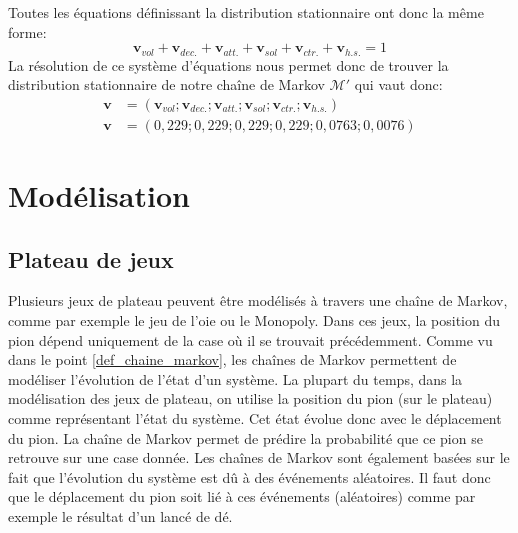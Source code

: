\documentclass[letterpaper]{article}
\begin{document}
      Toutes les équations définissant la distribution stationnaire ont donc  la même forme:
      $$\mathbf{v}_{vol} + \mathbf{v}_{dec.} + \mathbf{v}_{att.} + \mathbf{v}_{sol} + 
	\mathbf{v}_{ctr.} + \mathbf{v}_{h.s.} = 1$$
      La résolution de ce système d'équations nous permet donc de trouver la distribution
      stationnaire de notre chaîne de Markov $\mathcal{M}'$ qui vaut donc:
      \begin{align*}
       \mathbf{v} &= (\mathbf{v}_{vol}; \mathbf{v}_{dec.}; \mathbf{v}_{att.}; \mathbf{v}_{sol}; 
	  \mathbf{v}_{ctr.}; \mathbf{v}_{h.s.})\\
      \mathbf{v} &= (0,229; 0,229; 0,229; 0,229; 0,0763; 0,0076)
      \end{align*}
  
  
\section{Modélisation}

  \subsection{Plateau de jeux}
    Plusieurs jeux de plateau peuvent être modélisés à travers une chaîne de Markov,
    comme par exemple le jeu de l'oie ou le Monopoly.  Dans ces jeux,
    la position du pion dépend uniquement de la case où il se trouvait précédemment.
    Comme vu dans le point \ref{def_chaine_markov}, les chaînes de Markov permettent
    de modéliser l'évolution de l'état d'un système.  La plupart du temps, dans
    la modélisation des jeux de plateau, on utilise la position du pion (sur le plateau)
    comme représentant l'état du système.  Cet état évolue donc avec le déplacement du
    pion.  La chaîne de Markov permet de prédire la probabilité que ce pion se retrouve
    sur une case donnée.  Les chaînes de Markov sont également basées sur le fait que 
    l'évolution du système est dû à des événements aléatoires.  Il faut donc que le
    déplacement du pion soit lié à ces événements (aléatoires) comme par exemple le 
    résultat d'un lancé de dé. 
  
\end{document}
